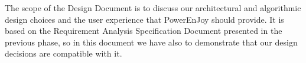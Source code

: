 The scope of the Design Document is to discuss our architectural and algorithmic design choices and the user experience that PowerEnJoy should provide. It is based on the Requirement Analysis Specification Document presented in the previous phase, so in this document we have also to demonstrate that our design decisions are compatible with it.
